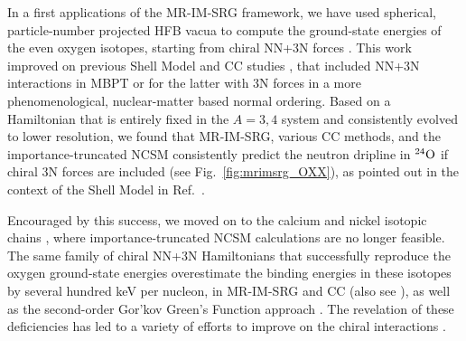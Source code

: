 
In a first applications of the MR-IM-SRG framework, we have used
spherical, particle-number projected HFB vacua to compute the
ground-state energies of the even oxygen isotopes, starting from
chiral NN+3N forces \cite{Hergert:2013ij}. This work improved on
previous Shell Model \cite{Otsuka:2010cr,Holt:2013fk} and CC studies
\cite{Hagen:2012oq}, that included NN+3N interactions in MBPT or for
the latter with 3N forces in a more phenomenological, nuclear-matter
based normal ordering.  Based on a Hamiltonian that is entirely fixed
in the $A=3,4$ system and consistently evolved to lower resolution, we
found that MR-IM-SRG, various CC methods, and the importance-truncated
NCSM consistently predict the neutron dripline in $\nuc{O}{24}$ if
chiral 3N forces are included (see Fig.~\ref{fig:mrimsrg_OXX}), as
pointed out in the context of the Shell Model in
Ref.~\cite{Otsuka:2010cr}.

Encouraged by this success, we moved on to the calcium and nickel
isotopic chains \cite{Hergert:2014vn}, where importance-truncated NCSM
calculations are no longer feasible. The same family of chiral NN+3N
Hamiltonians that successfully reproduce the oxygen ground-state
energies overestimate the binding energies in these isotopes by
several hundred keV per nucleon, in MR-IM-SRG and CC (also see
\cite{Roth:2012qf,Binder:2013zr,Binder:2014fk}), as well as the
second-order Gor'kov Green's Function approach \cite{Soma:2014eu}.
The revelation of these deficiencies has led to a variety of efforts
to improve on the chiral interactions
\cite{Ekstrom:2015fk,Hagen:2015ve,Epelbaum:2015fb,Epelbaum:2015gf,Entem:2015hl,Entem:2015qf,Carlsson:2015fk,Gezerlis:2014zr,Piarulli:2015rm,Lynn:2015eu}.

